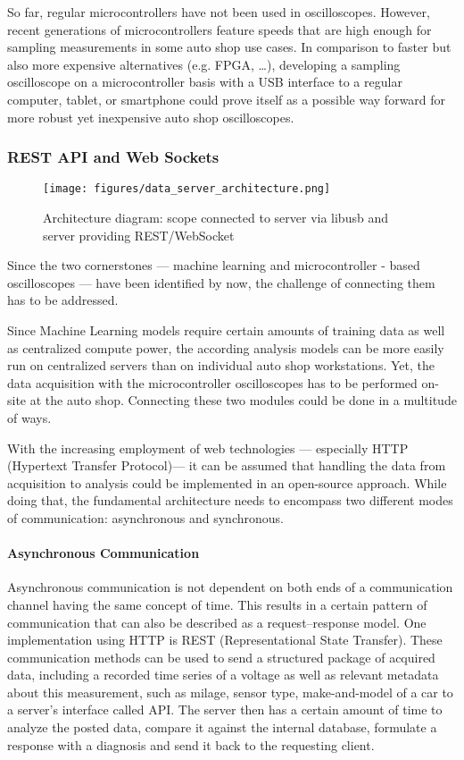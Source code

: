 So far, regular microcontrollers have not been used in oscilloscopes. 
However, recent generations of microcontrollers feature speeds that are high enough for sampling measurements in some auto shop use cases. 
In comparison to faster but also more expensive alternatives (e.g. FPGA, …), developing a sampling oscilloscope on a microcontroller basis with a USB interface to a regular computer, tablet, 
or smartphone could prove itself as a possible way forward for more robust yet inexpensive auto shop oscilloscopes.

\subsubsection{REST API and Web Sockets}
\begin{figure}[ht]
  \centering
  \texttt{[image: figures/data\_server\_architecture.png]}
  \caption{Architecture diagram: scope connected to server via libusb and server providing REST/WebSocket}
  \label{fig:data-server}
\end{figure}
Since the two cornerstones — machine learning and microcontroller - based oscilloscopes — have been identified by now, the challenge of connecting them has to be addressed.

Since Machine Learning models require certain amounts of training data as well as centralized compute power, the according analysis models can be more easily run on centralized servers than on individual auto shop workstations. 
Yet, the data acquisition with the microcontroller oscilloscopes has to be performed on-site at the auto shop. 
Connecting these two modules could be done in a multitude of ways.

With the increasing employment of web technologies — especially HTTP (Hypertext Transfer Protocol)— it can be assumed that handling the data from acquisition to analysis could be implemented in an open-source approach. 
While doing that, the fundamental architecture needs to encompass two different modes of communication: asynchronous and synchronous.

\paragraph{Asynchronous Communication}
Asynchronous communication is not dependent on both ends of a communication channel having the same concept of time. 
This results in a certain pattern of communication that can also be described as a request–response model. 
One implementation using HTTP is REST (Representational State Transfer). 
These communication methods can be used to send a structured package of acquired data, including a recorded time series of a voltage as well as relevant metadata about this measurement, such as milage, sensor type, make-and-model of a car to a server’s interface called API. 
The server then has a certain amount of time to analyze the posted data, compare it against the internal database, formulate a response with a diagnosis and send it back to the requesting client.

